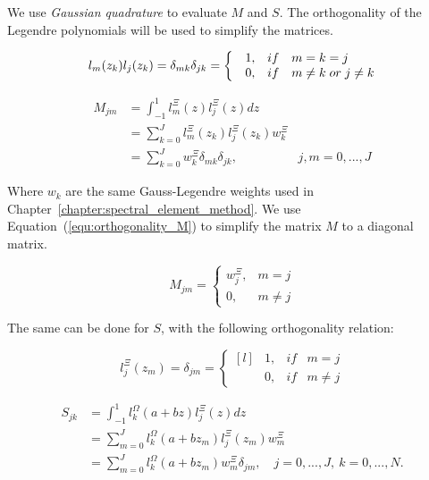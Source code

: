 We use \textit{Gaussian quadrature} to evaluate $M$ and $S$. The orthogonality of the Legendre polynomials
will be used to simplify the matrices.

\begin{equation} \label{equ:orthogonality_M}
	l_m (z_k) l_j (z_k) = \\
	\delta _{mk} \delta _{j k} = \left\{\begin{matrix*}[l]
	& 1, & if & m = k = j \\ 
	& 0, & if & m \neq k \; or \; j \neq k
	\end{matrix*}\right.
\end{equation}

\begin{equation} \label{equ:matrix_M}
	\begin{aligned}
		M_{jm} &= \int_{-1}^{1} l_m ^ \Xi (z) l_j ^ \Xi (z) dz \\
		&= \sum_{k = 0}^{J} l_m ^ \Xi (z_k) l_j ^ \Xi (z_k)w_k ^ \Xi \\
		&= \sum_{k = 0}^{J} w_k ^ \Xi \delta_{mk}\delta_{jk}, & j, m = 0, ..., J
	\end{aligned}
\end{equation}

Where $w_k$ are the same Gauss-Legendre weights used in
Chapter~\ref{chapter:spectral_element_method}. We use Equation~(\ref{equ:orthogonality_M}) to simplify
the matrix $M$ to a diagonal matrix.

\begin{equation}
	M_{jm} = \left\{\begin{matrix}
	w_j^{\Xi }, &  m = j \\ 
	0, & m \neq  j
	\end{matrix}\right.
\end{equation}

The same can be done for $S$, with the following orthogonality relation:

\begin{equation} \label{equ:orthogonality_S}
	l_j ^ \Xi (z_m) = \delta_{jm} = \left\{\begin{matrix*}[l]
	& 1, & if & m = j\\ 
	& 0, & if & m \neq j
	\end{matrix*}\right.
\end{equation}

\begin{equation} \label{equ:matrix_S}
	\begin{aligned}
		S_{jk} &= \int_{-1}^{1} l_k ^ \Omega (a + b z) l_j ^ \Xi (z)dz \\
		&= \sum_{m = 0}^{J} l_k ^ \Omega (a + b z_m) l_j ^ \Xi (z_m) w_m ^ \Xi \\
		&= \sum_{m = 0}^{J} l_k ^ \Omega (a + b z_m) w_m ^{\Xi} \delta_{jm}, \quad j = 0, ..., J, \: k = 0, ..., N.
	\end{aligned}
\end{equation}

